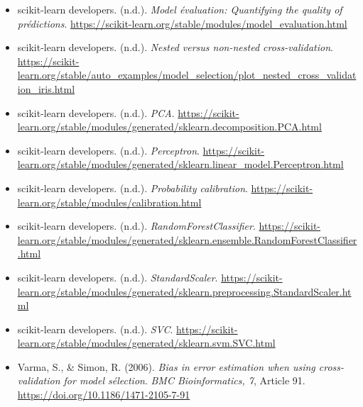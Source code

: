 \begin{itemize}
    \item scikit-learn developers. (n.d.). \emph{Model évaluation: Quantifying the quality of prédictions}. \url{https://scikit-learn.org/stable/modules/model_evaluation.html}
    \item scikit-learn developers. (n.d.). \emph{Nested versus non-nested cross-validation}. \url{https://scikit-learn.org/stable/auto_examples/model_selection/plot_nested_cross_validation_iris.html}
    \item scikit-learn developers. (n.d.). \emph{PCA}. \url{https://scikit-learn.org/stable/modules/generated/sklearn.decomposition.PCA.html}
    \item scikit-learn developers. (n.d.). \emph{Perceptron}. \url{https://scikit-learn.org/stable/modules/generated/sklearn.linear_model.Perceptron.html}
    \item scikit-learn developers. (n.d.). \emph{Probability calibration}. \url{https://scikit-learn.org/stable/modules/calibration.html}
    \item scikit-learn developers. (n.d.). \emph{RandomForestClassifier}. \url{https://scikit-learn.org/stable/modules/generated/sklearn.ensemble.RandomForestClassifier.html}
    \item scikit-learn developers. (n.d.). \emph{StandardScaler}. \url{https://scikit-learn.org/stable/modules/generated/sklearn.preprocessing.StandardScaler.html}
    \item scikit-learn developers. (n.d.). \emph{SVC}. \url{https://scikit-learn.org/stable/modules/generated/sklearn.svm.SVC.html}
    \item Varma, S., \& Simon, R. (2006). \emph{Bias in error estimation when using cross-validation for model sélection}. \emph{BMC Bioinformatics, 7}, Article 91.\\ \url{https://doi.org/10.1186/1471-2105-7-91}
\end{itemize}
